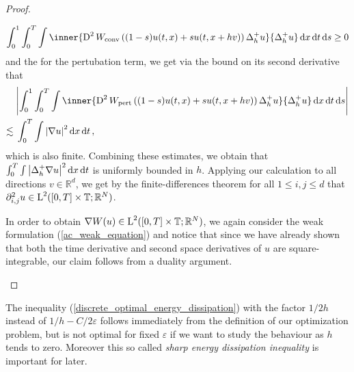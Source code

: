\begin{proof}
\begin{description}[wide=0pt]
	\begin{equation*}
			\int_{ 0 }^{ 1 }
		\int_{ 0 }^{ T }
		\int
		\inner{ 
			\diff^{ 2 } W_{ \mathrm{conv} } \left( ( 1- s ) u ( t, x  ) + s u( t,  x + h v ) \right) 
			\Delta_{ h }^{ + } u
		}{
			\Delta_{ h }^{ + } u 
		}
		\dd{ x }
		\dd{ t }
		\dd{ s }
		\geq 0 
	\end{equation*}
	and the for the pertubation term, we get via the bound on its second derivative that
	\begin{align*}
		& \abs{
		\int_{ 0 }^{ 1 }
		\int_{ 0 }^{ T }
		\int
		\inner{ 
			\diff^{ 2 } W_{ \mathrm{pert} } \left( (1 - s ) u ( t, x  ) + s  u( t,  x + h v )  \right) 
			\Delta_{ h }^{ + } u
		}{
			\Delta_{ h }^{ + } u 
		}
		\dd{ x }
		\dd{ t }
		\dd{ s }
		}
		\\
		\lesssim {} &
		\int_{ 0 }^{ T }
			\int
				\abs{ \nabla u }^{ 2 }
			\dd{ x }
		\dd{ t },
	\end{align*}
	which is also finite. 
	Combining these estimates, we obtain that $ \int_{ 0 }^{ T } \int \abs{ \Delta_{ h }^{ + } \nabla u }^{ 2 } \dd{ x } \dd{ t } $ is uniformly bounded in $ h $. Applying our calculation to all directions $ v \in \mathbb{ R }^{ d } $, we get by the finite-differences theorem for all $ 1 \leq i, j \leq d $ that $ \partial_{ i , j }^{ 2 } u \in \operatorname{L}^{ 2 } ( [ 0 , T ] \times \operatorname{\mathbb{T}} ; \mathbb{ R }^{ N } ) $.
	
	In order to obtain $ \nabla W ( u ) \in \operatorname{L}^{ 2 } ( [ 0 , T ] \times \operatorname{\mathbb{T}} ; \mathbb{ R }^{ N } ) $, we again consider the weak formulation (\ref{ac_weak_equation}) and notice that since we have already shown that both the time derivative and second space derivatives of $ u $ are square-integrable, our claim follows from a duality argument. 
	\end{description}
\end{proof}

\begin{remark}
	The inequality (\ref{discrete_optimal_energy_dissipation}) with the factor $ 1/2h $ instead of $ 1/h- C/2\varepsilon $ follows immediately from the definition of our optimization problem, but is not optimal for fixed $ \varepsilon $ if we want to study the behaviour as $ h $ tends to zero. Moreover this so called \emph{sharp energy dissipation inequality} is important for later.
\end{remark}

